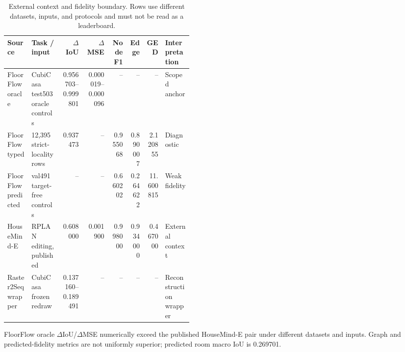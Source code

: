 \begin{table}[t]
\centering
\caption{External context and fidelity boundary. Rows use different datasets, inputs, and protocols and must not be read as a leaderboard.}
\label{tab:external}
\footnotesize
\setlength{\tabcolsep}{2pt}
\begin{tabular}{p{0.13\linewidth}p{0.16\linewidth}rrrrrp{0.15\linewidth}}
\toprule
Source & Task / input & $\Delta$IoU & $\Delta$MSE & Node F1 & Edge & GED & Interpretation \\
\midrule
FloorFlow oracle & CubiCasa test503 oracle controls & 0.956703--0.999801 & 0.000019--0.000096 & -- & -- & -- & Scoped anchor \\
FloorFlow typed & 12,395 strict-locality rows & 0.937473 & -- & 0.955068 & 0.890007 & 2.120855 & Diagnostic \\
FloorFlow predicted & val491 target-free controls & -- & -- & 0.660202 & 0.264622 & 11.600815 & Weak fidelity \\
HouseMind-E & RPLAN editing, published & 0.608000 & 0.001900 & 0.998000 & 0.934000 & 0.467000 & External context \\
Raster2Seq wrapper & CubiCasa frozen redraw & 0.137160--0.189491 & -- & -- & -- & -- & Reconstruction wrapper \\
\bottomrule
\end{tabular}
\par\smallskip\footnotesize FloorFlow oracle $\Delta$IoU/$\Delta$MSE numerically exceed the published HouseMind-E pair under different datasets and inputs. Graph and predicted-fidelity metrics are not uniformly superior; predicted room macro IoU is 0.269701.
\end{table}
